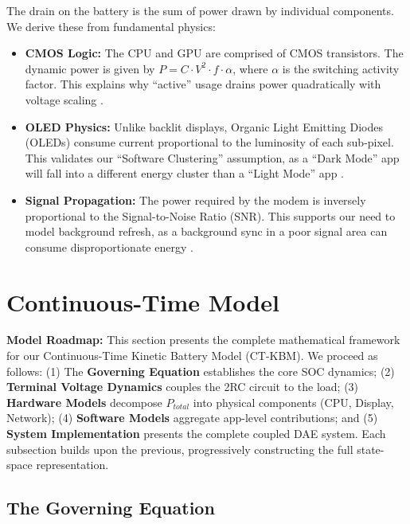 \documentclass[12pt]{article}
\begin{document}
The drain on the battery is the sum of power drawn by individual components. We derive these from fundamental physics:
\begin{itemize}
    \item \textbf{CMOS Logic:} The CPU and GPU are comprised of CMOS transistors. The dynamic power is given by $P = C \cdot V^2 \cdot f \cdot \alpha$, where $\alpha$ is the switching activity factor. This explains why ``active'' usage drains power quadratically with voltage scaling \cite{1}.
    \item \textbf{OLED Physics:} Unlike backlit displays, Organic Light Emitting Diodes (OLEDs) consume current proportional to the luminosity of each sub-pixel. This validates our ``Software Clustering'' assumption, as a ``Dark Mode'' app will fall into a different energy cluster than a ``Light Mode'' app \cite{2, 5}.
    \item \textbf{Signal Propagation:} The power required by the modem is inversely proportional to the Signal-to-Noise Ratio (SNR). This supports our need to model background refresh, as a background sync in a poor signal area can consume disproportionate energy \cite{13}.
\end{itemize}


\section{Continuous-Time Model}

\textbf{Model Roadmap:} This section presents the complete mathematical framework for our Continuous-Time Kinetic Battery Model (CT-KBM). We proceed as follows: (1) The \textbf{Governing Equation} establishes the core SOC dynamics; (2) \textbf{Terminal Voltage Dynamics} couples the 2RC circuit to the load; (3) \textbf{Hardware Models} decompose $P_{total}$ into physical components (CPU, Display, Network); (4) \textbf{Software Models} aggregate app-level contributions; and (5) \textbf{System Implementation} presents the complete coupled DAE system. Each subsection builds upon the previous, progressively constructing the full state-space representation.

\subsection{The Governing Equation}
\end{document}
